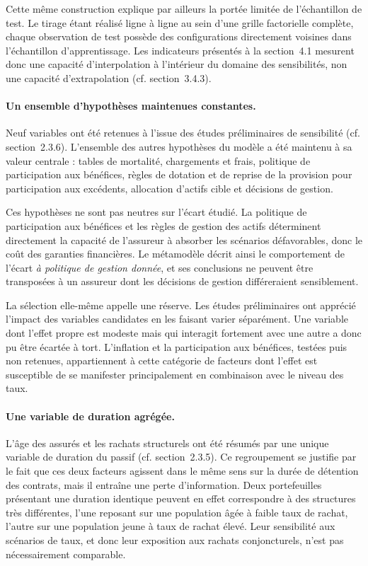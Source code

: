 Cette même construction explique par ailleurs la portée limitée de l'échantillon de test. Le tirage étant réalisé ligne à ligne au sein d'une grille factorielle complète, chaque observation de test possède des configurations directement voisines dans l'échantillon d'apprentissage. Les indicateurs présentés à la section~4.1 mesurent donc une capacité d'interpolation à l'intérieur du domaine des sensibilités, non une capacité d'extrapolation (cf. section~3.4.3).

\paragraph{Un ensemble d'hypothèses maintenues constantes.} Neuf variables ont été retenues à l'issue des études préliminaires de sensibilité (cf. section~2.3.6). L'ensemble des autres hypothèses du modèle a été maintenu à sa valeur centrale : tables de mortalité, chargements et frais, politique de participation aux bénéfices, règles de dotation et de reprise de la provision pour participation aux excédents, allocation d'actifs cible et décisions de gestion.

Ces hypothèses ne sont pas neutres sur l'écart étudié. La politique de participation aux bénéfices et les règles de gestion des actifs déterminent directement la capacité de l'assureur à absorber les scénarios défavorables, donc le coût des garanties financières. Le métamodèle décrit ainsi le comportement de l'écart \emph{à politique de gestion donnée}, et ses conclusions ne peuvent être transposées à un assureur dont les décisions de gestion différeraient sensiblement.

La sélection elle-même appelle une réserve. Les études préliminaires ont apprécié l'impact des variables candidates en les faisant varier séparément. Une variable dont l'effet propre est modeste mais qui interagit fortement avec une autre a donc pu être écartée à tort. L'inflation et la participation aux bénéfices, testées puis non retenues, appartiennent à cette catégorie de facteurs dont l'effet est susceptible de se manifester principalement en combinaison avec le niveau des taux.

\paragraph{Une variable de duration agrégée.} L'âge des assurés et les rachats structurels ont été résumés par une unique variable de duration du passif (cf. section~2.3.5). Ce regroupement se justifie par le fait que ces deux facteurs agissent dans le même sens sur la durée de détention des contrats, mais il entraîne une perte d'information. Deux portefeuilles présentant une duration identique peuvent en effet correspondre à des structures très différentes, l'une reposant sur une population âgée à faible taux de rachat, l'autre sur une population jeune à taux de rachat élevé. Leur sensibilité aux scénarios de taux, et donc leur exposition aux rachats conjoncturels, n'est pas nécessairement comparable.

